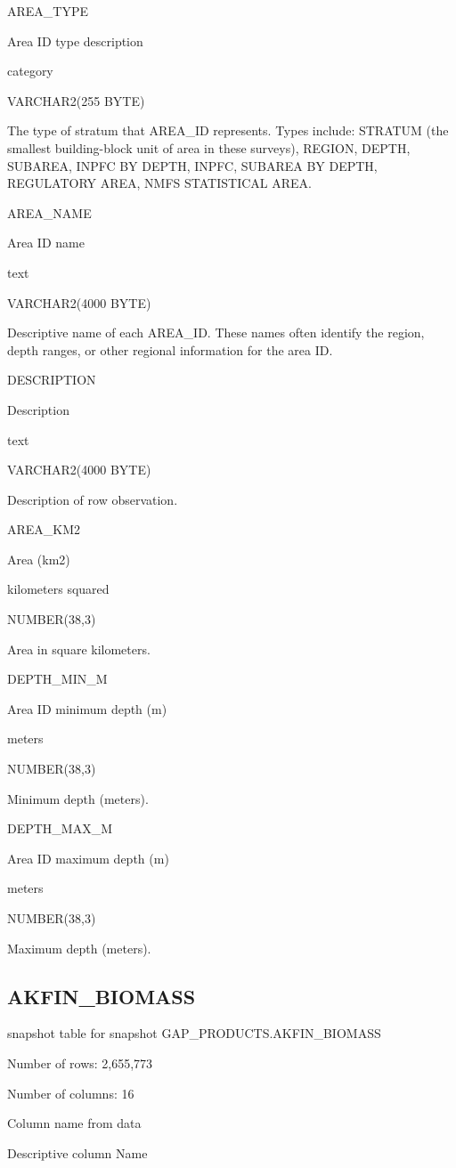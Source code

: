 \documentclass[
  letterpaper,
  oneside,
  open=any]{scrbook}
\begin{document}
AREA\_TYPE

Area ID type description

category

VARCHAR2(255 BYTE)

The type of stratum that AREA\_ID represents. Types include: STRATUM
(the smallest building-block unit of area in these surveys), REGION,
DEPTH, SUBAREA, INPFC BY DEPTH, INPFC, SUBAREA BY DEPTH, REGULATORY
AREA, NMFS STATISTICAL AREA.

AREA\_NAME

Area ID name

text

VARCHAR2(4000 BYTE)

Descriptive name of each AREA\_ID. These names often identify the
region, depth ranges, or other regional information for the area ID.

DESCRIPTION

Description

text

VARCHAR2(4000 BYTE)

Description of row observation.

AREA\_KM2

Area (km2)

kilometers squared

NUMBER(38,3)

Area in square kilometers.

DEPTH\_MIN\_M

Area ID minimum depth (m)

meters

NUMBER(38,3)

Minimum depth (meters).

DEPTH\_MAX\_M

Area ID maximum depth (m)

meters

NUMBER(38,3)

Maximum depth (meters).

\subsection{AKFIN\_BIOMASS}\label{akfin_biomass}

snapshot table for snapshot GAP\_PRODUCTS.AKFIN\_BIOMASS

Number of rows: 2,655,773

Number of columns: 16

Column name from data

Descriptive column Name
\end{document}
